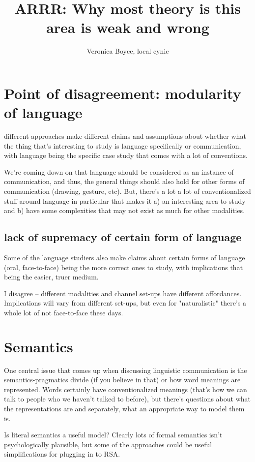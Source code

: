 \documentclass[]{article}
\title{ARRR: Why most theory is this area is weak and wrong}
\author{Veronica Boyce, local cynic}
\begin{document}
\maketitle

\section{Point of disagreement: modularity of language}
different approaches make different claims and assumptions about whether what the thing that's interesting to study is language specifically or communication, with language being the specific case study that comes with a lot of conventions. 

We're coming down on that language should be considered as an instance of communication, and thus, the general things should also hold for other forms of communication (drawing, gesture, etc). But, there's a lot a lot of conventionalized stuff around language in particular that makes it a) an interesting area to study and b) have some complexities that may not exist as much for other modalities. 

\subsection{lack of supremacy of certain form of language}
Some of the language studiers also make claims about certain forms of language (oral, face-to-face) being the more correct ones to study, with implications that being the easier, truer medium. 

I disagree -- different modalities and channel set-ups have different affordances. Implications will vary from different set-ups, but even for "naturalistic" there's a whole lot of not face-to-face these days. 

\section{Semantics}
One central issue that comes up when discussing linguistic communication is the semantics-pragmatics divide (if you believe in that) or how word meanings are represented. Words certainly have conventionalized meanings (that's how we can talk to people who we haven't talked to before), but there's questions about what the representations are and separately, what an appropriate way to model them is. 

Is literal semantics a useful model? Clearly lots of formal semantics isn't psychologically plausible, but some of the approaches could be useful simplifications for plugging in to RSA. 
\end{document}
